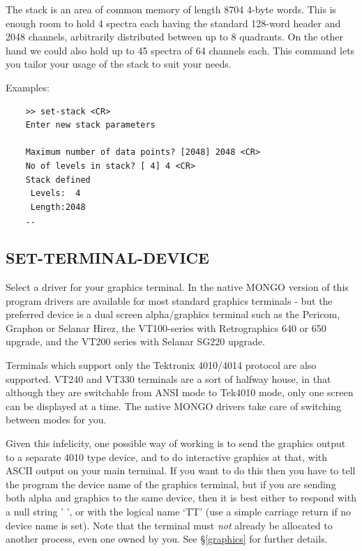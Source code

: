 \documentclass[11pt,twoside]{report}
\begin{document}
The stack is an area of common memory of length 8704 4-byte words. This is
enough room to hold 4 spectra each having the standard 128-word header and 2048
channels, arbitrarily distributed between up to 8 quadrants. On the other hand
we could also hold up to 45 spectra of 64 channels each. This command lets you
tailor your usage of the stack to suit your needs.

Examples:
\begin{verbatim}
    >> set-stack <CR>
    Enter new stack parameters

    Maximum number of data points? [2048] 2048 <CR>
    No of levels in stack? [ 4] 4 <CR>
    Stack defined
     Levels:  4
     Length:2048
    ..
\end{verbatim}

\subsection{SET-TERMINAL-DEVICE} 

Select a driver for your graphics terminal. In the native MONGO version
of this program drivers are available for most standard graphics terminals -
but the preferred device is a dual screen alpha/graphics terminal such as the
Pericom, Graphon or Selanar Hirez, the VT100-series with Retrographics 640 or
650 upgrade, and the VT200 series with Selanar SG220 upgrade.   
 

Terminals which support only the Tektronix 4010/4014 protocol are also
supported. VT240 and VT330 terminals are a sort of halfway house, in that
 
although they are switchable from ANSI mode to Tek4010 mode, only one
screen can be displayed at a time. The native MONGO drivers take care of
switching between modes for you.

Given this infelicity, one possible way of working is to send the graphics
output to a separate 4010 type device, and to do interactive graphics
at that, with ASCII output on your main terminal. If you want to do this
then you have to tell the program the device name of the graphics terminal,
but if you are sending both alpha and graphics to the same device, then
it is best either to respond with a null string ' ', or with the logical name
`TT' (use a simple carriage return if no device name is set). Note that the
terminal must {\em not} already be allocated to another process, even one
owned by you. See \S\ref{graphics} for further details.
\end{document}
